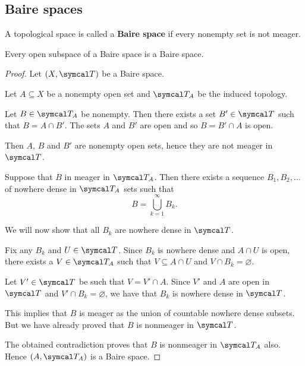 \subsection{Baire spaces}\label{subsec:baire_spaces}

\begin{definition}\label{def:baire_space}
  A topological space is called a \textbf{Baire space} if every nonempty set is not meager.
\end{definition}

\begin{proposition}\label{thm:open_subspace_of_baire_space_is_baire}
  Every open subspace of a Baire space is a Baire space.
\end{proposition}
\begin{proof}
  Let \( (X, \Cal{T}) \) be a Baire space.

  Let \( A \subseteq X \) be a nonempty open set and \( \Cal{T}_A \) be the induced topology.

  Let \( B \in \Cal{T}_A \) be nonempty. Then there exists a set \( B' \in \Cal{T} \) such that \( B = A \cap B' \). The sets \( A \) and \( B' \) are open and so \( B = B' \cap A \) is open.

  Then \( A \), \( B \) and \( B' \) are nonempty open sets, hence they are not meager in \( \Cal{T} \).

  Suppose that \( B \) in meager in \( \Cal{T}_A \). Then there exists a sequence \( B_1, B_2, \ldots \) of nowhere dense in \( \Cal{T}_A \) sets such that
  \begin{equation*}
    B = \bigcup_{k=1}^\infty B_k.
  \end{equation*}

  We will now show that all \( B_k \) are nowhere dense in \( \Cal{T} \).

  Fix any \( B_k \) and \( U \in \Cal{T} \). Since \( B_k \) is nowhere dense and \( A \cap U \) is open, there exists a \( V \in \Cal{T}_A \) such that \( V \subseteq A \cap U \) and \( V \cap B_k = \varnothing \).

  Let \( V' \in \Cal{T} \) be such that \( V = V' \cap A \). Since \( V' \) and \( A \) are open in \( \Cal{T} \) and \( V' \cap B_k = \varnothing \), we have that \( B_k \) is nowhere dense in \( \Cal{T} \).

  This implies that \( B \) is meager as the union of countable nowhere dense subsets. But we have already proved that \( B \) is nonmeager in \( \Cal{T} \).

  The obtained contradiction proves that \( B \) is nonmeager in \( \Cal{T}_A \) also. Hence \( (A, \Cal{T}_A) \) is a Baire space.
\end{proof}
